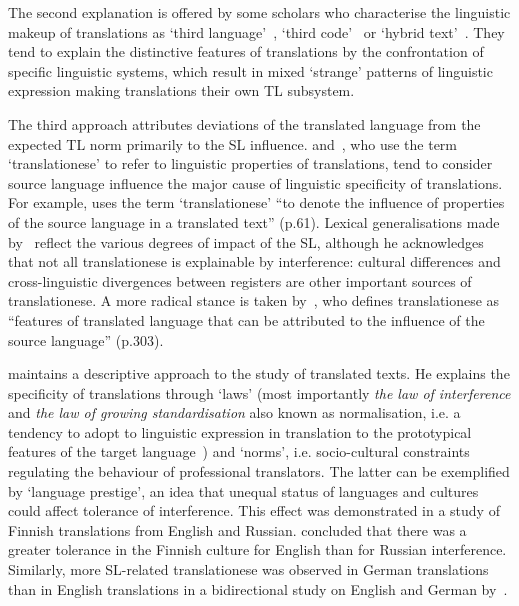 The second explanation is offered by some scholars who characterise the linguistic makeup of translations as `third language'~\cite{Duff1981}, `third code'~\cite{Frawley1984} or `hybrid text'~\cite{Schaffner2001a,Schaffner2001b}. They tend to explain the distinctive features of translations by the confrontation of specific linguistic systems, which result in mixed `strange' patterns of linguistic expression making translations their own TL subsystem. 

The third approach attributes deviations of the translated language from the expected TL norm primarily to the SL influence. \citet{Gellerstam1986} and~\citet{Santos1995}, who use the term `translationese' to refer to linguistic properties of translations, tend to consider source language influence the major cause of linguistic specificity of translations. For example, \citet{Santos1995} uses the term `translationese' ``to denote the influence of properties of the source language in a translated text'' (p.61). Lexical generalisations made by~\citet{Gellerstam1986} reflect the various degrees of impact of the SL, although he acknowledges that not all translationese is explainable by interference: cultural differences and cross-linguistic divergences between registers are other important sources of translationese. A more radical stance is taken by~\citet{Rabadan2009}, who defines translationese as ``features of translated language that can be attributed to the influence of the source language'' (p.303).

\citet{Toury1995} maintains a descriptive approach to the study of translated texts. He explains the specificity of translations through `laws' (most importantly \textit{the law of interference} and \textit{the law of growing standardisation} also known as normalisation, i.e. a tendency to adopt to linguistic expression in translation to the prototypical features of the target language~\cite{Denturck2009}) and `norms', i.e. socio-cultural constraints regulating the behaviour of professional translators. The latter can be exemplified by `language prestige', an idea that unequal status of languages and cultures could affect tolerance of interference. This effect was demonstrated in a study of Finnish translations from English and Russian. \citet[p.72]{Mauranen2004} concluded that there was a greater tolerance in the Finnish culture for English than for Russian interference. Similarly, more SL-related translationese was observed in German translations than in English translations in a bidirectional study on English and German by~\citet{Evert2017}. 

